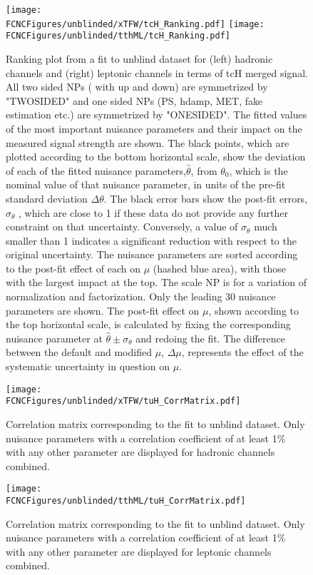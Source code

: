 \begin{figure}[htb]
\centering
\texttt{[image: \\FCNCFigures/unblinded/xTFW/tcH\_Ranking.pdf]}
\texttt{[image: \\FCNCFigures/unblinded/tthML/tcH\_Ranking.pdf]}
\caption{ Ranking plot from a fit to unblind dataset for (left) hadronic channels and (right)
leptonic channels in terms of tcH merged signal. All two sided NPs ( with up and down) are symmetrized by "TWOSIDED" and one sided NPs (PS, hdamp, MET, fake estimation etc.) are symmetrized by "ONESIDED". The fitted values of the most important nuisance parameters and their impact on the measured
signal strength are shown. The black points, which are plotted according to the bottom horizontal scale, show the deviation
of each of the fitted nuisance parameters,$\hat{\theta}$, from $\theta_{0}$, which is the nominal value of that nuisance parameter, in units of the
pre-fit standard deviation $\Delta\theta$. The black error bars show the post-fit errors, $\sigma_{\theta}$ , which are close to 1 if these data do not
provide any further constraint on that uncertainty. Conversely, a value of $\sigma_{\theta}$ much smaller than 1 indicates a significant
reduction with respect to the original uncertainty. The nuisance parameters are sorted according to the post-fit effect of each on $\mu$ (hashed blue area),
with those with the largest impact at the top. The scale NP is for a variation of normalization and factorization. Only the leading 30 nuisance parameters are shown. The post-fit effect on $\mu$,
shown according to the top horizontal scale, is calculated by fixing the corresponding nuisance parameter at $\hat{\theta}\pm \sigma_{\theta}$ and
redoing the fit. The difference between the default and modified $\mu$, $\Delta\mu$, represents the effect of the systematic uncertainty
in question on $\mu$.}
\label{fig:fcnc_rank_data_tcH}
\end{figure}


\begin{figure}[htb]
\centering
\texttt{[image: \\FCNCFigures/unblinded/xTFW/tuH\_CorrMatrix.pdf]}
\caption{ Correlation matrix corresponding to the fit to unblind dataset. Only nuisance parameters with a correlation coefficient of at least 1\% with any other parameter are displayed for hadronic channels combined.}
\label{fig:fcnc_correl_data_1}
\end{figure}


\begin{figure}[htb]
\centering
\texttt{[image: \\FCNCFigures/unblinded/tthML/tuH\_CorrMatrix.pdf]}
\caption{ Correlation matrix corresponding to the fit to unblind dataset. Only nuisance parameters with a correlation coefficient of at least 1\% with any other parameter are displayed for leptonic channels combined.}
\label{fig:fcnc_correl_data_2}
\end{figure}
















